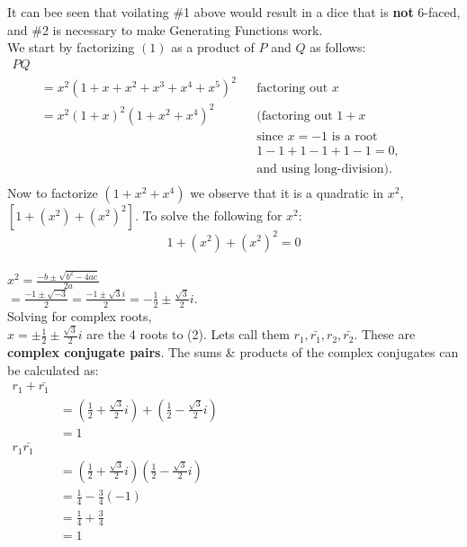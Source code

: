 \documentclass{article}
\begin{document}
{    It can bee seen that voilating \#1 above would result in a dice that
    is \textbf{not} 6-faced, and \#2 is necessary to make
    Generating Functions work.\\

    We start by factorizing $(1)$ as
    a product of $P$ and $Q$ as follows:\\

    $
    \begin{aligned}
        PQ\\
        & = x^2(1+x+x^2+x^3+x^4+x^5)^2
            && \text{factoring out $x$}\\
        & = x^2(1+x)^2(1+x^2+x^4)^2
            && \text{(factoring out $1+x$}\\
        &   && \text{since $x=-1$ is a root}\\
        &   && \text{$1 - 1 + 1 -1 + 1 - 1 = 0$,}\\
        &   && \text{and using long-division).}\\
    \end{aligned}
    $\\

    Now to factorize $(1+x^2+x^4)$ we observe that
    it is a quadratic in $x^2$, $[1+(x^2) + (x^2)^2]$.
    To solve the following for $x^2$:\\

    \begin{equation}
        1 + (x^2) + (x^2)^2 = 0
    \end{equation}\\

    $
    x^2 = \frac{-b \pm \sqrt{b^2-4ac}}{2a}$\\

    $
    = \frac{-1 \pm \sqrt{-3}}{2}
    = \frac{-1 \pm \sqrt{3}i}{2}
    = -\frac{1}{2} \pm \frac{\sqrt{3}}{2} i$.\\

    Solving for complex roots,\\

    $
    x = \pm \frac{1}{2} \pm \frac{\sqrt{3}}{2} i
    $ are the 4 roots to (2). Lets call them
    $r_1, \bar{r_1}, r_2, \bar{r_2}$.
    These are \textbf{complex conjugate pairs}.
    The sums \& products of the complex conjugates 
    can be calculated as:\\

    $
    \boxed{
        \begin{aligned}
            r_1+\bar{r_1}\\
            & = (\frac{1}{2} + \frac{\sqrt{3}}{2} i)
            + (\frac{1}{2} - \frac{\sqrt{3}}{2} i)\\
            & = 1\\
            r_1\bar{r_1}\\
            & = (\frac{1}{2} + \frac{\sqrt{3}}{2} i)
            (\frac{1}{2} - \frac{\sqrt{3}}{2} i)\\
            & = \frac{1}{4}-\frac{3}{4}(-1)\\
            & = \frac{1}{4}+\frac{3}{4}\\
            & = 1
        \end{aligned}
        }
    $\\

}
\end{document}
